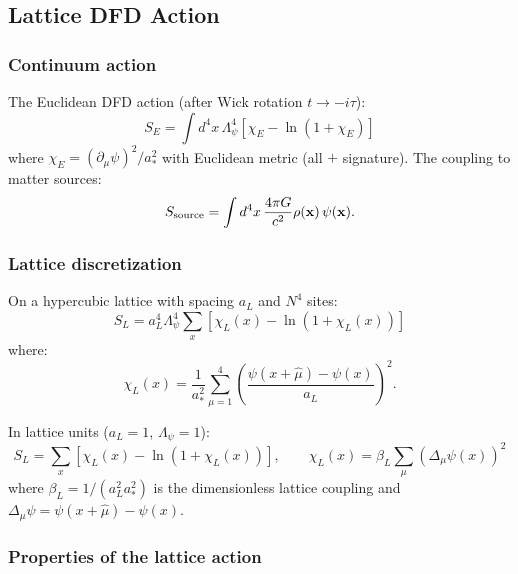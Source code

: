 \documentclass[11pt,a4paper]{article}
\begin{document}
\subsection{Lattice DFD Action}

\subsubsection{Continuum action}

The Euclidean DFD action (after Wick rotation $t \to -i\tau$):
\begin{equation}
S_E = \int d^4x\,\Lambda_\psi^4\left[\chi_E - \ln(1+\chi_E)\right]
\end{equation}
where $\chi_E = (\partial_\mu\psi)^2/a_*^2$ with Euclidean metric (all $+$ signature). The coupling to matter sources:
\begin{equation}
S_{\rm source} = \int d^4x\,\frac{4\pi G}{c^2}\rho(\mathbf{x})\,\psi(\mathbf{x}).
\end{equation}

\subsubsection{Lattice discretization}

On a hypercubic lattice with spacing $a_L$ and $N^4$ sites:
\begin{equation}
S_L = a_L^4 \Lambda_\psi^4 \sum_x \left[\chi_L(x) - \ln(1+\chi_L(x))\right]
\end{equation}
where:
\begin{equation}
\chi_L(x) = \frac{1}{a_*^2}\sum_{\mu=1}^4 \left(\frac{\psi(x+\hat\mu) - \psi(x)}{a_L}\right)^2.
\end{equation}

In lattice units ($a_L = 1$, $\Lambda_\psi = 1$):
\begin{equation}\label{eq:lattice-action}
S_L = \sum_x \left[\chi_L(x) - \ln(1+\chi_L(x))\right], \qquad \chi_L(x) = \beta_L \sum_\mu (\Delta_\mu\psi(x))^2
\end{equation}
where $\beta_L = 1/(a_L^2 a_*^2)$ is the dimensionless lattice coupling and $\Delta_\mu\psi = \psi(x+\hat\mu) - \psi(x)$.

\subsubsection{Properties of the lattice action}
\end{document}
